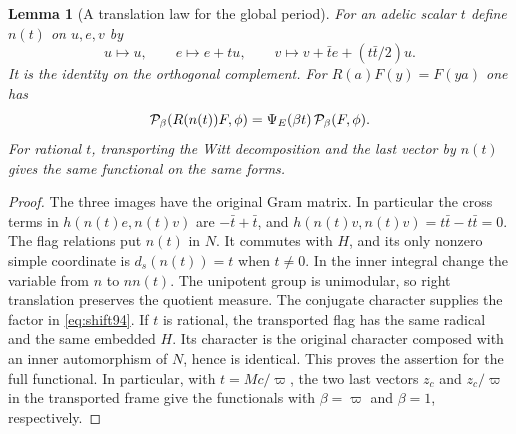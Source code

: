 \documentclass[a4paper,11pt]{article}
\newtheorem{lemma}[proposition]{Lemma}
\theoremstyle{definition}
\theoremstyle{remark}
\numberwithin{equation}{section}
\begin{document}
\begin{lemma}[A translation law for the global period]\label{lem:root94}
For an adelic scalar \(t\) define \(n(t)\) on \(u,e,v\) by
\[
 u\longmapsto u,\qquad e\longmapsto e+t u,\qquad
 v\longmapsto v+\bar t e+(t\bar t/2)u .
\]
It is the identity on the orthogonal complement. For
\(R(a)F(y)=F(ya)\) one has
\begin{equation}
 {\cal P}_\beta(R(n(t))F,\phi)=\Psi_E(\beta t)\,{\cal P}_\beta(F,\phi).
 \label{eq:shift94}
\end{equation}
For rational \(t\), transporting the Witt decomposition and the last
vector by \(n(t)\) gives the same functional on the same forms.
\end{lemma}
\begin{proof}
The three images have the original Gram matrix. In particular the
cross terms in \(h(n(t)e,n(t)v)\) are \(-\bar t+\bar t\), and
\(h(n(t)v,n(t)v)=t\bar t-t\bar t=0\).
The flag relations put \(n(t)\) in \(N\). It commutes with \(H\),
and its only nonzero simple coordinate is \(d_s(n(t))=t\)
when \(t\ne0\). In the inner integral change the variable from
\(n\) to \(n n(t)\). The unipotent group is unimodular, so
right translation preserves the quotient measure. The conjugate
character supplies the factor in \eqref{eq:shift94}. If \(t\)
is rational, the transported flag has the same radical and the
same embedded \(H\). Its character is the original character
composed with an inner automorphism of \(N\), hence is identical.
This proves the assertion for the full functional. In particular,
with \(t=Mc/\varpi\), the two last vectors \(z_c\) and \(z_c/\varpi\)
in the transported frame give the functionals with \(\beta=\varpi\)
and \(\beta=1\), respectively.
\end{proof}
\end{document}
